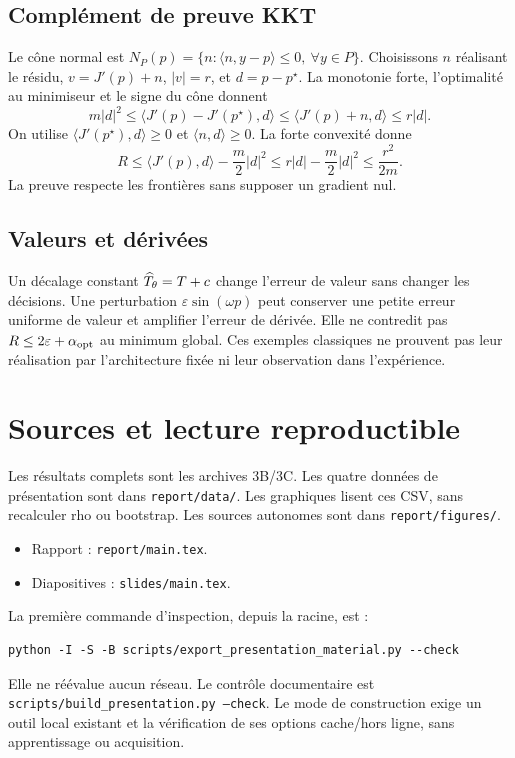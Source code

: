 \documentclass[11pt,a4paper]{article}
\begin{document}
\subsection{Complément de preuve KKT}
Le cône normal est
$N_P(p)=\{n:\langle n,y-p\rangle\leq0,\ \forall y\in P\}$.
Choisissons $n$ réalisant le résidu, $v=J'(p)+n$, $|v|=r$,
et $d=p-p^\star$.
La monotonie forte, l'optimalité au minimiseur et le signe du cône donnent
\[
m|d|^2\leq\langle J'(p)-J'(p^\star),d\rangle
\leq\langle J'(p)+n,d\rangle\leq r|d|.
\]
On utilise $\langle J'(p^\star),d\rangle\geq0$ et
$\langle n,d\rangle\geq0$. La forte convexité donne
\[
R\leq\langle J'(p),d\rangle-\frac m2|d|^2
\leq r|d|-\frac m2|d|^2\leq\frac{r^2}{2m}.
\]
La preuve respecte les frontières sans supposer un gradient nul.

\subsection{Valeurs et dérivées}
Un décalage constant $\widehat T_\theta=T+c$ change l'erreur de valeur sans changer
les décisions. Une perturbation $\varepsilon\sin(\omega p)$ peut conserver
une petite erreur uniforme de valeur et amplifier l'erreur de dérivée.
Elle ne contredit pas $R\leq2\varepsilon+\alpha_{\rm opt}$ au minimum global.
Ces exemples classiques ne prouvent pas leur réalisation par
l'architecture fixée ni leur observation dans l'expérience.

\clearpage
\section{Sources et lecture reproductible}
Les résultats complets sont les archives 3B/3C. Les quatre données de
présentation sont dans \texttt{report/data/}. Les graphiques lisent ces CSV,
sans recalculer rho ou bootstrap. Les sources autonomes sont dans
\texttt{report/figures/}.
\begin{itemize}
\item Rapport : \texttt{report/main.tex}.
\item Diapositives : \texttt{slides/main.tex}.
\end{itemize}

La première commande d'inspection, depuis la racine, est :
\begin{verbatim}
python -I -S -B scripts/export_presentation_material.py --check
\end{verbatim}
Elle ne réévalue aucun réseau. Le contrôle documentaire est
\texttt{scripts/build\_presentation.py --check}.
Le mode de construction exige un outil local existant et la vérification
de ses options cache/hors ligne, sans apprentissage ou acquisition.
\end{document}
